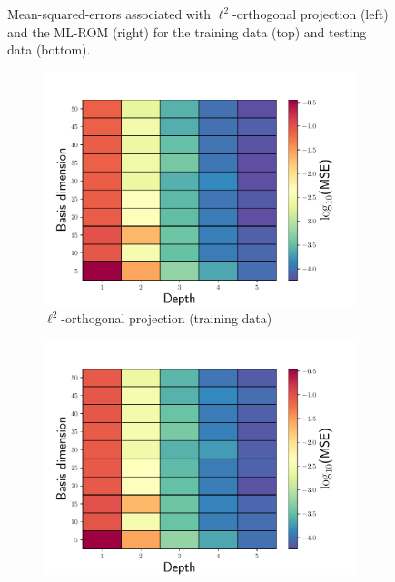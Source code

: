 \documentclass[3p,computermodern,10pt]{elsarticle}
\begin{document}
\begin{figure}
\begin{center}
\caption{Mean-squared-errors associated with $\ell^2$-orthogonal projection (left) and the ML-ROM (right) for the training data (top) and testing data (bottom).}
\label{fig:burg_training_test_projection_mse}
\end{center}
\end{figure}

\begin{figure}
\begin{center}
\begin{subfigure}[t]{0.49\textwidth}
\includegraphics[trim={0cm 0cm 0cm 0cm},clip,width=1.0\linewidth]{code/burgers/synapse_models/basis_study_indistribution/MSE_testing.pdf}
\caption{$\ell^2$-orthogonal projection (training data)}
\end{subfigure}
\begin{subfigure}[t]{0.49\textwidth}
\includegraphics[trim={0cm 0cm 0cm 0cm},clip,width=1.0\linewidth]{code/burgers/synapse_models/basis_study_indistribution/MSE_testing_ML.pdf}

\end{subfigure}
\end{center}
\end{figure}
\end{document}
